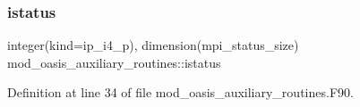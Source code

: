 \subsubsection{\texorpdfstring{istatus}{istatus}}
{\footnotesize\ttfamily integer(kind=ip\+\_\+i4\+\_\+p), dimension(mpi\+\_\+status\+\_\+size) mod\+\_\+oasis\+\_\+auxiliary\+\_\+routines\+::istatus\hspace{0.3cm}{\ttfamily [private]}}



Definition at line 34 of file mod\+\_\+oasis\+\_\+auxiliary\+\_\+routines.\+F90.

